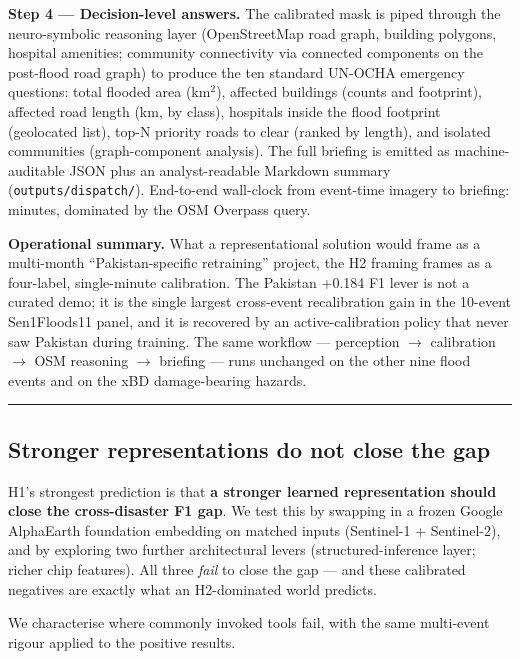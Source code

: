 \textbf{Step 4 --- Decision-level answers.} The calibrated mask is piped
through the neuro-symbolic reasoning layer (OpenStreetMap road graph,
building polygons, hospital amenities; community connectivity via
connected components on the post-flood road graph) to produce the ten
standard UN-OCHA emergency questions: total flooded area
(km$^{2}$), affected buildings (counts and footprint), affected road length
(km, by class), hospitals inside the flood footprint (geolocated list),
top-N priority roads to clear (ranked by length), and isolated
communities (graph-component analysis). The full briefing is emitted
as machine-auditable JSON plus an analyst-readable Markdown summary
(\texttt{outputs/dispatch/}). End-to-end wall-clock from event-time imagery
to briefing: minutes, dominated by the OSM Overpass query.

\textbf{Operational summary.} What a representational solution would frame
as a multi-month ``Pakistan-specific retraining'' project, the H2 framing
frames as a four-label, single-minute calibration. The Pakistan +0.184
F1 lever is not a curated demo; it is the single largest cross-event
recalibration gain in the 10-event Sen1Floods11 panel, and it is
recovered by an active-calibration policy that never saw Pakistan
during training. The same workflow --- perception $\rightarrow$ calibration $\rightarrow$ OSM
reasoning $\rightarrow$ briefing --- runs unchanged on the other nine flood events
and on the xBD damage-bearing hazards.

\begin{center}\rule{0.5\linewidth}{0.5pt}\end{center}

\subsection{Stronger representations do not close the gap}\label{stronger-representations-do-not-close-the-gap}

H1's strongest prediction is that \textbf{a stronger learned representation
should close the cross-disaster F1 gap}. We test this by swapping in a
frozen Google AlphaEarth foundation embedding on matched inputs
(Sentinel-1 + Sentinel-2), and by exploring two further architectural
levers (structured-inference layer; richer chip features). All three
\emph{fail} to close the gap --- and these calibrated negatives are exactly
what an H2-dominated world predicts.

We characterise where commonly invoked tools fail, with the same multi-event
rigour applied to the positive results.

